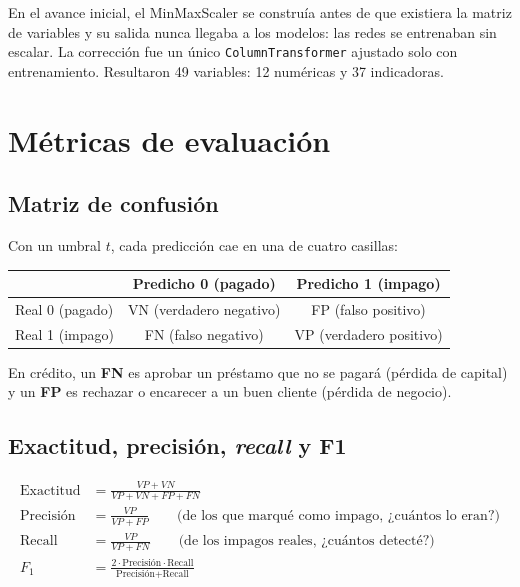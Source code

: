 \documentclass[11pt,a4paper]{article}
\newcommand{\code}[1]{\texttt{#1}}
\begin{document}
\begin{proyecto}
En el avance inicial, el MinMaxScaler se construía antes de que existiera la matriz de variables y su salida nunca llegaba a los modelos: las redes se entrenaban sin escalar. La corrección fue un único \code{ColumnTransformer} ajustado solo con entrenamiento. Resultaron 49 variables: 12 numéricas y 37 indicadoras.
\end{proyecto}

\section{Métricas de evaluación}\label{sec:metricas}

\subsection{Matriz de confusión}

Con un umbral $t$, cada predicción cae en una de cuatro casillas:

\begin{table}[H]
\centering
\begin{tabular}{lcc}
\toprule
 & Predicho 0 (pagado) & Predicho 1 (impago) \\
\midrule
Real 0 (pagado) & VN (verdadero negativo) & FP (falso positivo) \\
Real 1 (impago) & FN (falso negativo) & VP (verdadero positivo) \\
\bottomrule
\end{tabular}
\end{table}

En crédito, un \textbf{FN} es aprobar un préstamo que no se pagará (pérdida de capital) y un \textbf{FP} es rechazar o encarecer a un buen cliente (pérdida de negocio).

\subsection{Exactitud, precisión, \textit{recall} y F1}

\begin{align}
\text{Exactitud} &= \frac{VP+VN}{VP+VN+FP+FN} \\
\text{Precisión} &= \frac{VP}{VP+FP} \qquad \text{(de los que marqué como impago, ¿cuántos lo eran?)} \\
\text{Recall} &= \frac{VP}{VP+FN} \qquad \text{(de los impagos reales, ¿cuántos detecté?)} \\
F_1 &= \frac{2\cdot \text{Precisión}\cdot\text{Recall}}{\text{Precisión}+\text{Recall}}
\end{align}
\end{document}
